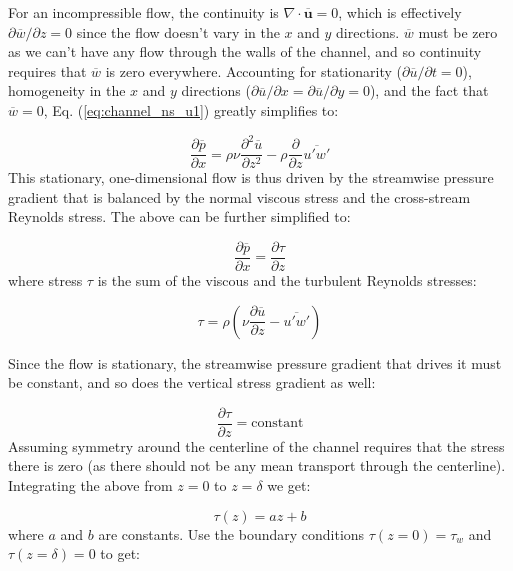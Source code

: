 \documentclass[12pt]{article}
\numberwithin{equation}{section}
\numberwithin{figure}{section}
\numberwithin{table}{section}
\begin{document}
For an incompressible flow, the continuity is $\nabla \cdot \overline{\mathbf{u}} = 0$,
which is effectively $\partial \overline{w}/\partial z = 0$ since the flow
doesn't vary in the $x$ and $y$ directions.
$\overline{w}$ must be zero as we can't have any flow through the walls of the channel,
and so continuity requires that $\overline{w}$ is zero everywhere.
Accounting for stationarity ($\partial \overline{u}/\partial t = 0$),
homogeneity in the $x$ and $y$ directions
($\partial \overline{u}/\partial x = \partial \overline{u}/\partial y = 0$),
and the fact that $\overline{w} = 0$, Eq. (\ref{eq:channel_ns_u1}) greatly
simplifies to:

\begin{equation}
  \frac{\partial \overline{p}}{\partial x} =
  \rho \nu \frac{\partial^2 \overline{u}}{\partial z^2} -
  \rho \frac{\partial}{\partial z}\overline{u'w'}
\end{equation}
This stationary, one-dimensional flow is thus driven by the streamwise pressure
gradient that is balanced by the normal viscous stress and the cross-stream
Reynolds stress.
The above can be further simplified to:

\begin{equation}
  \frac{\partial \overline{p}}{\partial x} =
  \frac{\partial \tau}{\partial z}
\end{equation}
where stress $\tau$ is the sum of the viscous and the turbulent Reynolds
stresses:

\begin{equation}
  \tau = \rho \left( \nu \frac{\partial \overline{u}}{\partial z} - \overline{u'w'} \right)
  \label{eq:channel_tau}
\end{equation}

Since the flow is stationary, the streamwise pressure gradient that drives it
must be constant, and so does the vertical stress gradient as well:

\begin{equation}
  \frac{\partial \tau}{\partial z} = \text{constant}
\end{equation}
Assuming symmetry around the centerline of the channel requires that the stress
there is zero (as there should not be any mean transport through the centerline).
Integrating the above from $z=0$ to $z=\delta$ we get:

\begin{equation}
  \tau(z) = a z + b
\end{equation}
where $a$ and $b$ are constants.
Use the boundary conditions $\tau(z=0) = \tau_w$ and $\tau(z=\delta) = 0$ to get:
\end{document}
